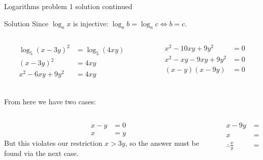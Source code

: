 \begin{namedframe}{Logarithms problem 1 solution continued}
	\begin{block}{Solution}
		Since $\log_a x$ is injective: $\log_a b = \log_a c \iff b = c$.
		\pause
		\begin{columns}[t]
			\begin{column}{0.5\textwidth}
				\begin{align*}
					\log_5(x-3y)^2    &= \log_5(4xy)\\
					(x - 3y)^2        &= 4xy\\
					x^2 - 6xy + 9y^2  &= 4xy\\
				\end{align*}
			\end{column}
			\pause
			\begin{column}{0.5\textwidth}
				\begin{align*}
					x^2 - 10xy + 9y^2 &= 0\\
					x^2 - xy - 9xy + 9y^2 &= 0\\
					(x - y)(x - 9y)   &= 0
				\end{align*}
			\end{column}
		\end{columns}
		\vspace{-2ex}
		\pause
		From here we have two cases:
		\pause
		\vspace{-3ex}
		\begin{columns}[onlytextwidth,t]
			\begin{column}{0.7\textwidth}
				\begin{align*}
					x - y &= 0\\
					x     &= y
				\end{align*}
				But this violates our restriction $x > 3y$, so the answer must be found via the next case.
			\end{column}
			\pause
			\begin{column}{0.3\textwidth}
				\begin{align*}
					x - 9y                 &= 0\\
					x                      &= 9y\\
					\therefore \frac{x}{y} &= 9
				\end{align*}
			\end{column}
		\end{columns}
	\end{block}
\end{namedframe}
